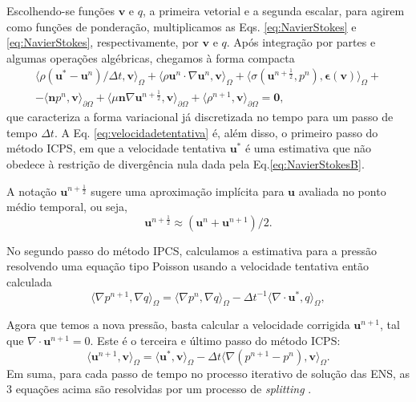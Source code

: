 Escolhendo-se funções $\boldsymbol{v}$ e $q$, a primeira vetorial e a segunda escalar, para agirem como funções de ponderação, multiplicamos as Eqs. \eqref{eq:NavierStokes} e \eqref{eq:NavierStokes}, respectivamente, por $\boldsymbol{v}$ e $q$. Após integração por partes e algumas operações algébricas, chegamos à forma compacta 
\begin{align}
\label{eq:velocidadetentativa}
	\langle \rho (\boldsymbol{u}^*-\boldsymbol{u}^n)/\Delta t, \boldsymbol{v} \rangle_{\Omega} 
	+ \langle \rho \boldsymbol{u}^n \cdot \nabla \boldsymbol{u}^n, \boldsymbol{v} \rangle_{\Omega} 
	+ \langle \sigma (\boldsymbol{u}^{n + \frac{1}{2}}, 	p^n),\boldsymbol{\epsilon}(\boldsymbol{v}) \rangle_{\Omega} + \nonumber \\
	- \langle \boldsymbol{n}p^n,\boldsymbol{v} \rangle _ {\partial \Omega} 
	+ \langle \mu \boldsymbol{n} \nabla \boldsymbol{u}^{n + \frac{1}{2}},\boldsymbol{v} \rangle_{\partial \Omega} 
	+ \langle \rho^{n+1}, \boldsymbol{v} \rangle_{\partial \Omega}
	=\boldsymbol{0},
\end{align}
que caracteriza a forma variacional já discretizada no tempo para um passo de tempo $\Delta t$. A Eq. \eqref{eq:velocidadetentativa} é, além disso, o primeiro passo do método ICPS, em que a velocidade tentativa $\boldsymbol{u}^*$ é uma estimativa que não obedece à restrição de divergência nula dada pela Eq.\eqref{eq:NavierStokesB}.

A notação $\boldsymbol{u}^{n+\frac{1}{2}}$ sugere uma aproximação implícita para $\boldsymbol{u}$ avaliada no ponto médio temporal, ou seja,
$$\boldsymbol{u}^{n+\frac{1}{2}} \approx (\boldsymbol{u}^n + \boldsymbol{u}^{n+1})/2.$$

No segundo passo do método IPCS, calculamos a estimativa para a pressão resolvendo uma equação tipo Poisson usando a velocidade tentativa então calculada
\begin{equation}\label{eq:pressure}
	\langle \nabla p^{n+1} ,\nabla q \rangle_{\Omega} 
	= \langle \nabla p^n , \nabla q\rangle_{\Omega} 
	- \Delta t^{-1} \langle \nabla \cdot \boldsymbol{u}^{*},q \rangle_{\Omega},
\end{equation}

Agora que temos a nova pressão, basta calcular a velocidade corrigida $\boldsymbol{u}^{n+1}$, tal que $\nabla \cdot \boldsymbol{u}^{n+1} = 0$. Este é o terceira e último passo do método ICPS:
\begin{equation}\label{eq:corrected_velocity}
	\langle \boldsymbol{u}^{n+1}, \boldsymbol{v} \rangle_{\Omega} 
	= \langle \boldsymbol{u}^*, \boldsymbol{v} \rangle_{\Omega} 
	- \Delta t \langle \nabla (p^{n+1}-p^n), \boldsymbol{v} \rangle _{\Omega}.
\end{equation}
Em suma, para cada passo de tempo no processo iterativo de solução das ENS, as 3 equações acima são resolvidas por um processo de \textit{splitting} \cite{Langtangen}. 

